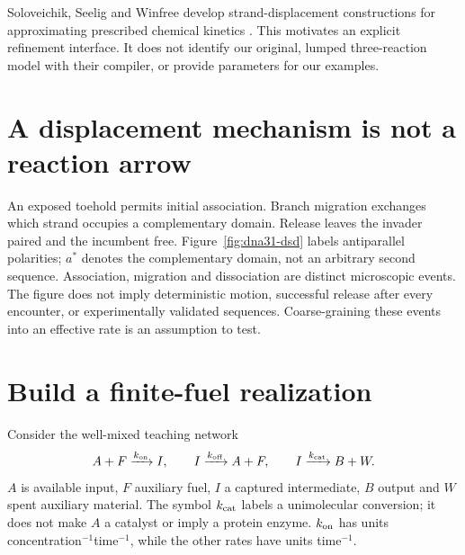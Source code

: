 Soloveichik, Seelig and Winfree develop strand-displacement constructions for
approximating prescribed chemical kinetics \cite{dna31-soloveichik}. This motivates
an explicit refinement interface. It does not identify our original, lumped
three-reaction model with their compiler, or provide parameters for our examples.

\section{A displacement mechanism is not a reaction arrow}
An exposed toehold permits initial association. Branch migration exchanges which
strand occupies a complementary domain. Release leaves the invader paired and
the incumbent free. Figure~\ref{fig:dna31-dsd} labels antiparallel polarities;
$a^*$ denotes the complementary domain, not an arbitrary second sequence.
Association, migration and dissociation are distinct microscopic events. The
figure does not imply deterministic motion, successful release after every
encounter, or experimentally validated sequences. Coarse-graining these events
into an effective rate is an assumption to test.

\section{Build a finite-fuel realization}
Consider the well-mixed teaching network
\begin{equation}
 A+F\xrightarrow{k_{\rm on}}I,\qquad
 I\xrightarrow{k_{\rm off}}A+F,\qquad
 I\xrightarrow{k_{\rm cat}}B+W.
 \label{eq:dna31-network}
\end{equation}
$A$ is available input, $F$ auxiliary fuel, $I$ a captured intermediate,
$B$ output and $W$ spent auxiliary material. The symbol $k_{\rm cat}$ labels a
unimolecular conversion; it does not make $A$ a catalyst or imply a protein
enzyme. $k_{\rm on}$ has units concentration$^{-1}$time$^{-1}$, while the other
rates have units time$^{-1}$.

